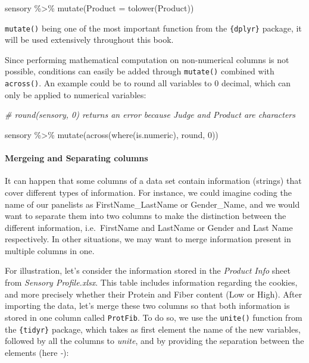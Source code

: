 \documentclass[
]{book}
\newenvironment{Shaded}{\begin{snugshade}}{\end{snugshade}}
\newcommand{\AttributeTok}[1]{\textcolor[rgb]{0.77,0.63,0.00}{#1}}
\newcommand{\CommentTok}[1]{\textcolor[rgb]{0.56,0.35,0.01}{\textit{#1}}}
\newcommand{\DecValTok}[1]{\textcolor[rgb]{0.00,0.00,0.81}{#1}}
\newcommand{\FunctionTok}[1]{\textcolor[rgb]{0.00,0.00,0.00}{#1}}
\newcommand{\NormalTok}[1]{#1}
\newcommand{\SpecialCharTok}[1]{\textcolor[rgb]{0.00,0.00,0.00}{#1}}
\begin{document}
\begin{Shaded}
\begin{Highlighting}[]
\NormalTok{sensory }\SpecialCharTok{\%\textgreater{}\%} 
  \FunctionTok{mutate}\NormalTok{(}\AttributeTok{Product =} \FunctionTok{tolower}\NormalTok{(Product))}
\end{Highlighting}
\end{Shaded}

\texttt{mutate()} being one of the most important function from the \texttt{\{dplyr\}} package, it will be used extensively throughout this book.

Since performing mathematical computation on non-numerical columns is not possible, conditions can easily be added through \texttt{mutate()} combined with \texttt{across()}. An example could be to round all variables to 0 decimal, which can only be applied to numerical variables:

\begin{Shaded}
\begin{Highlighting}[]
\CommentTok{\# round(sensory, 0) returns an error because Judge and Product are characters}

\NormalTok{sensory }\SpecialCharTok{\%\textgreater{}\%} 
  \FunctionTok{mutate}\NormalTok{(}\FunctionTok{across}\NormalTok{(}\FunctionTok{where}\NormalTok{(is.numeric), round, }\DecValTok{0}\NormalTok{))}
\end{Highlighting}
\end{Shaded}

\hypertarget{mergeing-and-separating-columns}{%
\paragraph{Mergeing and Separating columns}\label{mergeing-and-separating-columns}}

It can happen that some columns of a data set contain information (strings) that cover different types of information. For instance, we could imagine coding the name of our panelists as FirstName\_LastName or Gender\_Name, and we would want to separate them into two columns to make the distinction between the different information, i.e.~FirstName and LastName or Gender and Last Name respectively. In other situations, we may want to merge information present in multiple columns in one.

For illustration, let's consider the information stored in the \emph{Product Info} sheet from \emph{Sensory Profile.xlsx}. This table includes information regarding the cookies, and more precisely whether their Protein and Fiber content (Low or High). After importing the data, let's merge these two columns so that both information is stored in one column called \texttt{ProtFib}.
To do so, we use the \texttt{unite()} function from the \texttt{\{tidyr\}} package, which takes as first element the name of the new variables, followed by all the columns to \emph{unite}, and by providing the separation between the elements (here \emph{-}):
\end{document}
